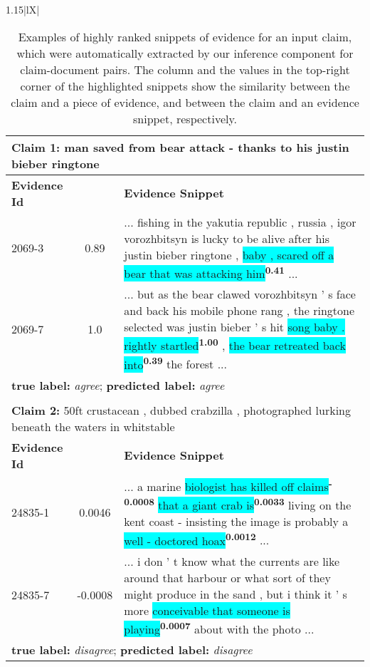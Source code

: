 \documentclass[11pt,a4paper]{article}
\begin{document}
\begin{table}
{\begin{tabularx}{1.15\linewidth}{|lX|}
\begin{table*}\small
\centering
\begin{tabular}{lcp{110mm}}
\hline
\multicolumn{3}{l}{\textbf{Claim 1:} man saved from bear attack - thanks to his justin bieber ringtone}\\
\hline
\textbf{Evidence Id} & \textbf{} & \textbf{Evidence Snippet}\\
\hline
2069-3 & 0.89 & ... fishing in the yakutia republic , russia , igor vorozhbitsyn is lucky to be alive after his justin bieber ringtone , \colorbox{cyan}{baby , scared off a bear that was attacking him}\textsuperscript{\bf{0.41}} ...\\ 
2069-7  & 1.0 & ... but as the bear clawed vorozhbitsyn ' s face and back his mobile phone rang , the ringtone selected was justin bieber ' s hit \colorbox{cyan}{song baby . rightly startled}\textsuperscript{\bf{1.00}} , \colorbox{cyan}{the bear retreated back into}\textsuperscript{\bf{0.39}} the forest ...\\
\hline
\multicolumn{3}{l}{\textbf{true label:} \textit{agree}; \textbf{predicted label:} \it{agree}}\\
\hline\\
\hline
\multicolumn{3}{l}{\textbf{Claim 2:} 50ft crustacean , dubbed crabzilla , photographed lurking beneath the waters in whitstable}\\
\hline
\textbf{Evidence Id} & \textbf{} & \textbf{Evidence Snippet}\\
\hline
24835-1 & 0.0046 & ... a marine \colorbox{cyan}{biologist has killed off claims}\textsuperscript{\bf{-0.0008}} \colorbox{cyan}{that a giant crab is}\textsuperscript{\bf{0.0033}} living on the kent coast - insisting the image is probably a \colorbox{cyan}{well - doctored hoax}\textsuperscript{\bf{0.0012}} ...\\ 
24835-7  & -0.0008 & ... i don ' t know what the currents are like around that harbour or what sort of they might produce in the sand , but i think it ' s more \colorbox{cyan}{conceivable that someone is playing}\textsuperscript{\bf{0.0007}} about with the photo ...\\
\hline
\multicolumn{3}{l}{\textbf{true label:} \textit{disagree}; \textbf{predicted label:} \it{disagree}}\\
\hline
\end{tabular}

\caption{Examples of highly ranked snippets of evidence for an input claim, which were automatically extracted by our inference component for claim-document pairs. The  column and the values in the top-right corner of the highlighted snippets show the similarity between the claim and a piece of evidence, and between the claim and an evidence snippet, respectively.}
\label{tbl:snippets_inference}
\end{table*}



\end{tabularx}}
\end{table}
\end{document}
